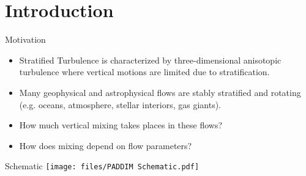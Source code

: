 \documentclass{beamer}
\begin{document}
\section{Introduction}


\begin{frame}{Motivation}
\begin{itemize}
\item  Stratified Turbulence is characterized by three-dimensional anisotopic turbulence where vertical motions are limited due to stratification. 

\item Many geophysical and astrophysical flows are stably stratified and rotating (e.g. oceans, atmosphere, stellar interiors, gas giants).

\item How much vertical mixing takes places in these flows? 

\item How does mixing depend on flow parameters?


\end{itemize}


\end{frame}

\begin{frame}{Schematic}
    \texttt{[image: files/PADDIM Schematic.pdf]}

\end{frame}
\end{document}
